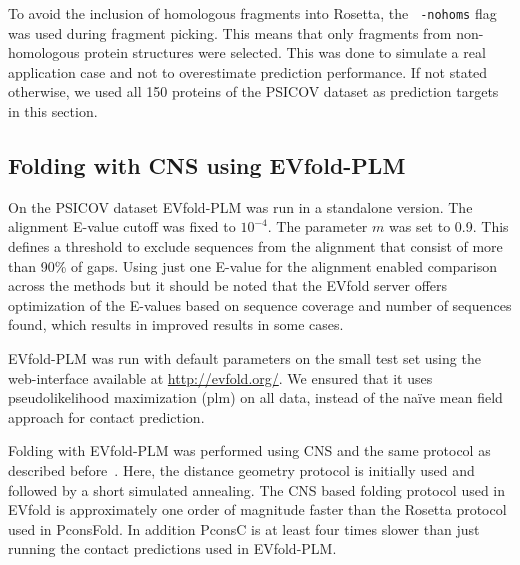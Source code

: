 \documentclass{bioinfo}
\begin{document}
\begin{methods}
To avoid the inclusion of homologous fragments into Rosetta, the {\tt
  -nohoms} flag was used during fragment
picking. This means that only fragments from non-homologous protein structures were selected. This
was done to simulate a real application case and not to overestimate
prediction performance. If not stated otherwise, we used all 150 proteins of
the PSICOV dataset as prediction targets in this section. 


\subsection{Folding with CNS using EVfold-PLM}
On the PSICOV dataset EVfold-PLM was run in a standalone version. The
alignment E-value cutoff was fixed to $10^{-4}$. The parameter $m$ was
set to 0.9. This defines a threshold to exclude sequences from the
alignment that consist of more than 90\% of gaps. Using just one E-value for the alignment  enabled comparison across the methods but it should be noted that the EVfold server offers optimization of the E-values based on sequence coverage and number of sequences found, which results in improved results in some cases. 

EVfold-PLM was run with default parameters on the small test set using
the web-interface available at \url{http://evfold.org/}. We ensured
that it uses pseudolikelihood maximization (plm) on all data, instead of the na\"ive mean field approach for contact prediction.

Folding with EVfold-PLM was performed using CNS and the same protocol
as described before~\cite[]{marks_protein_2011}. Here, the distance
geometry protocol is initially used and followed by a short simulated
annealing. The CNS based {\color{red}folding} protocol used in EVfold is approximately
one order of magnitude faster than the Rosetta protocol used in
PconsFold. In addition PconsC is at least four times slower than just
running the contact predictions used in EVfold-PLM.


\end{methods}
\end{document}
